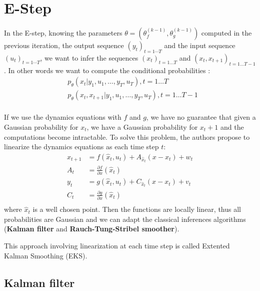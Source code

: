 \section{E-Step}

In the E-step, knowing the parameters $\theta = (\theta_f^{(k-1)}, \theta_g^{(k-1)})$ computed in the previous iteration, the output sequence $(y_t)_{t=1 \cdots T}$ and the input sequence $(u_t)_{t=1 \cdots T}$, we want to infer the sequences $(x_t)_{t=1 \ldots T}$ and $(x_t, x_{t+1})_{t=1 \ldots T-1}$.
In other words we want to compute the conditional probabilities :
\begin{align*}
  &p_{\theta}\left(x_t|y_1, u_1, \ldots, y_T, u_T \right ), t=1 \ldots T\\
  &p_{\theta}\left(x_t, x_{t+1}|y_1, u_1, \ldots, y_T, u_T \right ), t=1 \ldots T-1\\
\end{align*}

If we use the dynamics equations with $f$ and $g$, we have no guarantee that given a Gaussian probability for $x_t$, we have a Gaussian probability for $x_t+1$ and the computations become intractable.
To solve this problem, the authors propose to linearize the dynamics equations as each time step $t$:
\begin{align*}
	x_{t+1} &= f(\hat{x}_t, u_t) + A_{\hat{x}_t} (x - x_t) + w_t\\
  A_t &= \frac{\partial f}{\partial x}(\hat{x}_t)\\
	y_t &= g(\hat{x}_t, u_t) + C_{\hat{x}_t} (x - x_t) + v_t\\
  C_t &= \frac{\partial g}{\partial x}(\hat{x}_t)\\
\end{align*}
where $\hat{x}_t$ is a well chosen point.
Then the functions are locally linear, thus all probabilities are Gaussian and we can adapt the classical inferences algorithms (\textbf{Kalman filter} and \textbf{Rauch-Tung-Stribel smoother}).

This approach involving linearization at each time step is called Extented Kalman Smoothing (EKS).

\subsection{Kalman filter}

